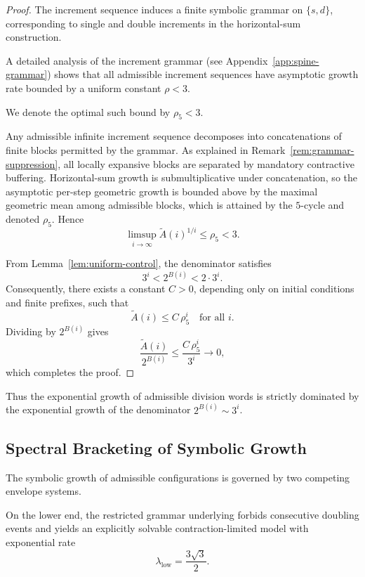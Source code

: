 \documentclass[12pt, oneside]{article}
\numberwithin{equation}{section}
\theoremstyle{definition}
\theoremstyle{plain}
\theoremstyle{remark}
\begin{document}
\begin{proof}
The increment sequence  induces a finite symbolic grammar on $\{s,d\}$,
corresponding to single and double increments in the horizontal-sum construction.

A detailed analysis of the increment grammar (see Appendix~\ref{app:spine-grammar})
shows that all admissible increment sequences have asymptotic growth rate bounded by a
uniform constant $\rho < 3$.

We denote the optimal such bound by $\rho_5 < 3$.

Any admissible infinite increment sequence decomposes into concatenations of finite
blocks permitted by the grammar. As explained in Remark~\ref{rem:grammar-suppression},
all locally expansive blocks are separated by mandatory contractive buffering. Horizontal-sum
growth is submultiplicative under concatenation, so the asymptotic per-step geometric
growth is bounded above by the maximal geometric mean among admissible blocks, which is
attained by the $5$-cycle and denoted $\rho_5$. Hence
\[
\limsup_{i\to\infty} \widetilde A(i)^{1/i} \le \rho_5 < 3.
\]

From Lemma~\ref{lem:uniform-control}, the denominator satisfies
\[
3^i < 2^{B(i)} < 2\cdot 3^i.
\]
Consequently, there exists a constant $C>0$, depending only on initial conditions
and finite prefixes, such that
\[
\widetilde A(i) \le C\,\rho_5^i \quad \text{for all } i.
\]
Dividing by $2^{B(i)}$ gives
\[
\frac{\widetilde A(i)}{2^{B(i)}} \le \frac{C\,\rho_5^i}{3^i} \longrightarrow 0,
\]
which completes the proof.
\end{proof}

Thus the exponential growth of admissible division words is strictly dominated
by the exponential growth of the denominator $2^{B(i)} \sim 3^i$.

\subsection{Spectral Bracketing of Symbolic Growth}
\label{sec:spectral-bracketing}
The symbolic growth of admissible configurations is governed by two competing
envelope systems.

On the lower end, the restricted grammar underlying  forbids
consecutive doubling events and yields an explicitly solvable contraction-limited
model with exponential rate
\[
\lambda_{\mathrm{low}} = \frac{3\sqrt{3}}{2}.
\]
\end{document}
